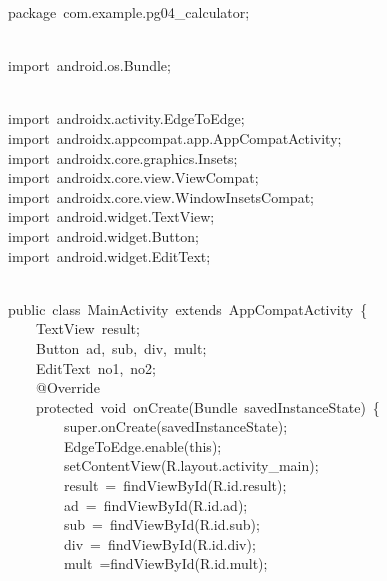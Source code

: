 {\ttfamily\small package\ com.example.pg04\_calculator;} \\
\strut \\
{\ttfamily\small import\ android.os.Bundle;} \\
\strut \\
{\ttfamily\small import\ androidx.activity.EdgeToEdge;} \\
{\ttfamily\small import\ androidx.appcompat.app.AppCompatActivity;} \\
{\ttfamily\small import\ androidx.core.graphics.Insets;} \\
{\ttfamily\small import\ androidx.core.view.ViewCompat;} \\
{\ttfamily\small import\ androidx.core.view.WindowInsetsCompat;} \\
{\ttfamily\small import\ android.widget.TextView;} \\
{\ttfamily\small import\ android.widget.Button;} \\
{\ttfamily\small import\ android.widget.EditText;} \\
\strut \\
{\ttfamily\small public\ class\ MainActivity\ extends\ AppCompatActivity\ \{} \\
{\ttfamily\small \ \ \ \ TextView\ result;} \\
{\ttfamily\small \ \ \ \ Button\ ad,\ sub,\ div,\ mult;} \\
{\ttfamily\small \ \ \ \ EditText\ no1,\ no2;} \\
{\ttfamily\small \ \ \ \ @Override} \\
{\ttfamily\small \ \ \ \ protected\ void\ onCreate(Bundle\ savedInstanceState)\ \{} \\
{\ttfamily\small \ \ \ \ \ \ \ \ super.onCreate(savedInstanceState);} \\
{\ttfamily\small \ \ \ \ \ \ \ \ EdgeToEdge.enable(this);} \\
{\ttfamily\small \ \ \ \ \ \ \ \ setContentView(R.layout.activity\_main);} \\
{\ttfamily\small \ \ \ \ \ \ \ \ result\ =\ findViewById(R.id.result);} \\
{\ttfamily\small \ \ \ \ \ \ \ \ ad\ =\ findViewById(R.id.ad);} \\
{\ttfamily\small \ \ \ \ \ \ \ \ sub\ =\ findViewById(R.id.sub);} \\
{\ttfamily\small \ \ \ \ \ \ \ \ div\ =\ findViewById(R.id.div);} \\
{\ttfamily\small \ \ \ \ \ \ \ \ mult\ =findViewById(R.id.mult);} \\
